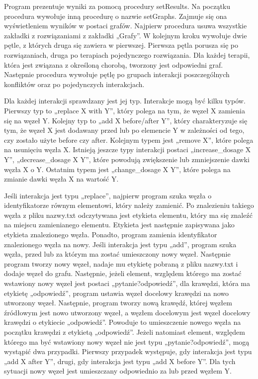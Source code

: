 Program prezentuje wyniki za pomocą procedury setResults. Na początku procedura wywołuje inną procedurę o nazwie setGraphs. Zajmuje się ona wyświetleniem wyników w postaci grafów. Najpierw procedura usuwa wszystkie zakładki z rozwiązaniami z zakładki „Grafy”. W kolejnym kroku wywołuje dwie pętle, z których druga się zawiera w pierwszej. Pierwsza pętla porusza się po rozwiązaniach, druga po terapiach pojedynczego rozwiązania. Dla każdej terapii, która jest związana z określoną chorobą, tworzony jest odpowiedni graf. Następnie procedura wywołuje pętlę po grupach interakcji poszczególnych konfliktów oraz po pojedynczych interakcjach. 

Dla każdej interakcji sprawdzany jest jej typ. Interakcje mogą być kilku typów. Pierwszy typ to „replace X with Y”, który polega na tym, że węzeł X zamienia się na węzeł Y. Kolejny typ to „add X before/after Y”, który charakteryzuje się tym, że węzeł X jest dodawany przed lub po elemencie Y w zależności od tego, czy zostało użyte before czy after. Kolejnym typem jest „remove X”, które polega na usunięciu węzła X. Istnieją jeszcze typy interakcji postaci „increase\_dosage X Y”, „decrease\_dosage X Y”, które powodują zwiększenie lub zmniejszenie dawki węzła X o Y. Ostatnim typem jest „change\_dosage X Y”, które polega na zmianie dawki węzła X na wartość Y.  

Jeśli interakcja jest typu „replace”, najpierw program szuka węzła o identyfikatorze równym elementowi, który należy zamienić. Po znalezieniu takiego węzła z pliku nazwy.txt odczytywana jest etykieta elementu, który ma się znaleźć na miejscu zamienianego elementu. Etykieta jest następnie zapisywana jako etykieta znalezionego węzła. Ponadto, program zamienia identyfikator znalezionego węzła na nowy. Jeśli interakcja jest typu „add”, program szuka węzła, przed lub za którym ma zostać umieszczony nowy węzeł. Następnie program tworzy nowy węzeł, nadaje mu etykietę pobraną z pliku nazwy.txt i dodaje węzeł do grafu. Następnie, jeżeli element, względem którego ma zostać wstawiony nowy węzeł jest postaci „pytanie?odpowiedź”, dla krawędzi, która ma etykietę „odpowiedź”, program ustawia węzeł docelowy krawędzi na nowo utworzony węzeł. Następnie, program tworzy nową krawędź, której węzłem źródłowym jest nowo utworzony węzeł, a węzłem docelowym jest węzeł docelowy krawędzi o etykiecie „odpowiedź”. Powoduje to umieszczenie nowego węzła na początku krawędzi z etykietą „odpowiedź”. Jeżeli natomiast element, względem którego ma być wstawiony nowy węzeł nie jest typu „pytanie?odpowiedź”, mogą wystąpić dwa przypadki. Pierwszy przypadek występuje, gdy interakcja jest typu „add X after Y”, drugi, gdy interakcja jest typu „add X before Y”. Dla tych sytuacji nowy węzeł jest umieszczany odpowiednio za lub przed węzłem Y. 

